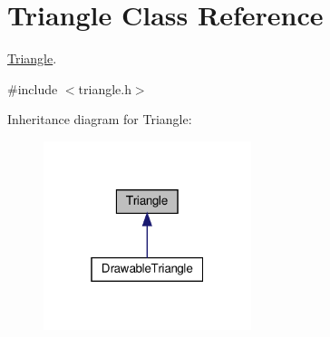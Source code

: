 \hypertarget{classTriangle}{}\section{Triangle Class Reference}
\label{classTriangle}


\hyperlink{classTriangle}{Triangle}.  




{\ttfamily \#include $<$triangle.\+h$>$}



Inheritance diagram for Triangle\+:\nopagebreak
\begin{figure}[H]
\begin{center}
\leavevmode
\includegraphics[width=172pt]{classTriangle__inherit__graph}
\end{center}
\end{figure}
